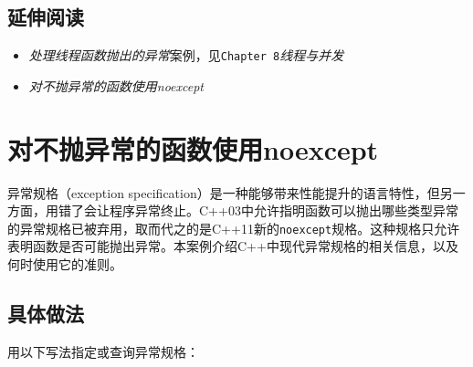 
\subsection{延伸阅读}



\begin{itemize}
\item \textit{处理线程函数抛出的异常}案例，见\texttt{Chapter 8}\textit{线程与}\textit{并发}



\item \textit{对不抛异常的函数使用noexcept}

\end{itemize}



\section{对不抛异常的函数使用noexcept}



异常规格（exception specification）是一种能够带来性能提升的语言特性，但另一方面，用错了会让程序异常终止。C++03中允许指明函数可以抛出哪些类型异常的异常规格已被弃用，取而代之的是C++11新的\texttt{noexcept}规格。这种规格只允许表明函数是否可能抛出异常。本案例介绍C++中现代异常规格的相关信息，以及何时使用它的准则。



\subsection{具体做法}



用以下写法指定或查询异常规格：



